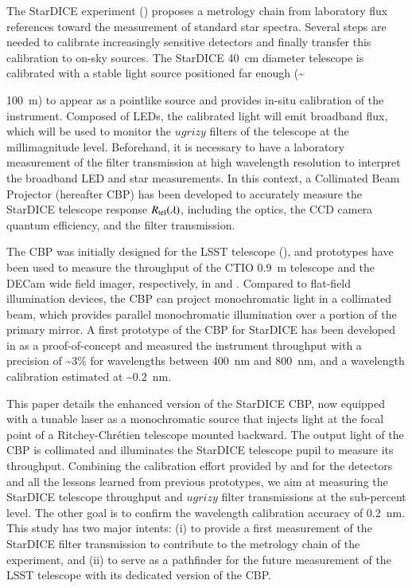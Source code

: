 The StarDICE experiment (\citealt{Betoule_2023}) proposes a metrology chain from laboratory flux references toward the measurement of standard star spectra. Several steps are needed to calibrate increasingly sensitive detectors and finally transfer this calibration to on-sky sources. The StarDICE \SI{40}{\centi\meter} diameter telescope is calibrated with a stable light source positioned far enough (\textasciitilde {\SI{100}{\meter}) to appear as a pointlike source and provides in-situ calibration of the instrument. Composed of LEDs, the calibrated light will emit broadband flux, which will be used to monitor the $ugrizy$ filters of the \SD{} telescope at the millimagnitude level. Beforehand, it is necessary to have a laboratory measurement of the filter transmission at high wavelength resolution to interpret the broadband LED and star measurements. In this context, a Collimated Beam Projector (hereafter CBP) has been developed to accurately measure the StarDICE telescope response $R_{\mathrm{tel}}(\lambda)$, including the optics, the CCD camera quantum efficiency, and the filter transmission. 

The CBP was initially designed for the LSST telescope (\citealt{ingraham2016}), and prototypes have been used to measure the throughput of the CTIO \SI{0.9}{\meter} telescope and the DECam wide field imager, respectively, in \cite{coughlin2018} and \cite{coughlin2016}. Compared to flat-field illumination devices, the CBP can project monochromatic light in a collimated beam, which provides parallel monochromatic illumination over a portion of the primary mirror. A first prototype of the CBP for StarDICE has been developed in \cite{Mondrik_2023} as a proof-of-concept and measured the instrument throughput with a precision of \textasciitilde 3\% for wavelengths between \SI{400}{\nano\meter} and \SI{800}{\nano\meter}, and a wavelength calibration estimated at \textasciitilde \SI{0.2}{\nano\meter}. 

This paper details the enhanced version of the StarDICE CBP, now equipped with a tunable laser as a monochromatic source that injects light at the focal point of a Ritchey-Chrétien telescope mounted backward. The output light of the CBP is collimated and illuminates the StarDICE telescope pupil to measure its throughput. Combining the calibration effort provided by \cite{houston2008detectors} and \cite{solarcell} for the detectors and all the lessons learned from previous prototypes, we aim at measuring the StarDICE telescope throughput and $ugrizy$ filter transmissions at the sub-percent level. The other goal is to confirm the wavelength calibration accuracy of \SI{0.2}{\nano\meter}. This study has two major intents: (i) to provide a first measurement of the StarDICE filter transmission to contribute to the metrology chain of the experiment, and (ii) to serve as a pathfinder for the future measurement of the LSST telescope with its dedicated version of the CBP.

}
